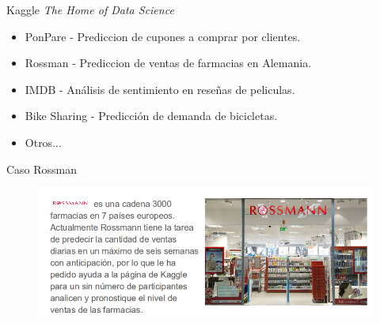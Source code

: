 \documentclass{bredelebeamer}
\begin{document}

\begin{frame}{Kaggle \textit{The Home of Data Science}}

\begin{itemize}

  \item PonPare - Prediccion de cupones a comprar por clientes.
  \item Rossman - Prediccion de ventas de farmacias en Alemania.
  \item IMDB - An\'alisis de sentimiento en rese\~nas de peliculas.
  \item Bike Sharing - Predicci\'on de demanda de bicicletas.
  \item Otros...
\end{itemize}


\end{frame}


\begin{frame}{Caso Rossman}

\begin{figure}[H]
\centering
\includegraphics[scale=.36]{images/Zuri1.png}
\end{figure}


\end{frame}

\end{document}
